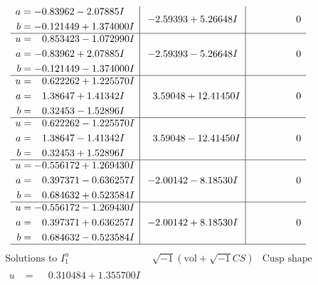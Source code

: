 \documentclass[1p]{elsarticle_modified}
\theoremstyle{definition}
\newcommand{\I}{\sqrt{-1}}
\begin{document}
$$\begin{array}{c|c|c}
\begin{aligned}
a &= -0.83962 - 2.07885 I \\
b &= -0.121449 + 1.374000 I\end{aligned}
 & -2.59393 + 5.26648 I & \phantom{-0.000000 } 0 \\ \hline\begin{aligned}
u &= \phantom{-}0.853423 - 1.072990 I \\
a &= -0.83962 + 2.07885 I \\
b &= -0.121449 - 1.374000 I\end{aligned}
 & -2.59393 - 5.26648 I & \phantom{-0.000000 } 0 \\ \hline\begin{aligned}
u &= \phantom{-}0.622262 + 1.225570 I \\
a &= \phantom{-}1.38647 + 1.41342 I \\
b &= \phantom{-}0.32453 - 1.52896 I\end{aligned}
 & \phantom{-}3.59048 + 12.41450 I & \phantom{-0.000000 } 0 \\ \hline\begin{aligned}
u &= \phantom{-}0.622262 - 1.225570 I \\
a &= \phantom{-}1.38647 - 1.41342 I \\
b &= \phantom{-}0.32453 + 1.52896 I\end{aligned}
 & \phantom{-}3.59048 - 12.41450 I & \phantom{-0.000000 } 0 \\ \hline\begin{aligned}
u &= -0.556172 + 1.269430 I \\
a &= \phantom{-}0.397371 - 0.636257 I \\
b &= \phantom{-}0.684632 + 0.523584 I\end{aligned}
 & -2.00142 - 8.18530 I & \phantom{-0.000000 } 0 \\ \hline\begin{aligned}
u &= -0.556172 - 1.269430 I \\
a &= \phantom{-}0.397371 + 0.636257 I \\
b &= \phantom{-}0.684632 - 0.523584 I\end{aligned}
 & -2.00142 + 8.18530 I & \phantom{-0.000000 } 0\\
 \hline 
 \end{array}$$\newpage$$\begin{array}{c|c|c}  
\text{Solutions to }I^u_{1}& \I (\text{vol} + \sqrt{-1}CS) & \text{Cusp shape}\\
 \hline 
\begin{aligned}
u &= \phantom{-}0.310484 + 1.355700 I \\

\end{aligned}
\end{array}$$
\end{document}
